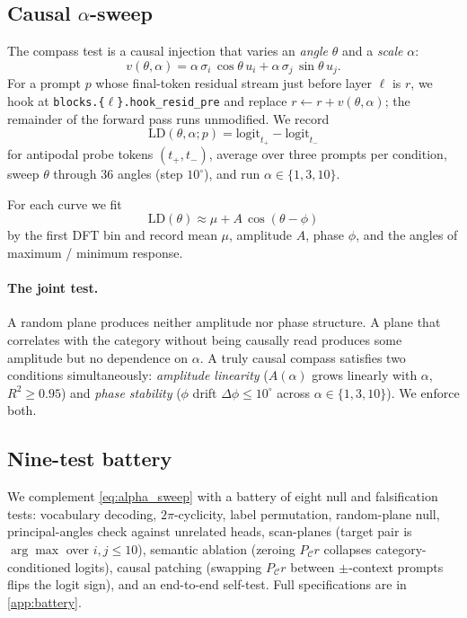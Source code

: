 \subsection{Causal $\alpha$-sweep}
\label{sec:alpha_sweep}

The compass test is a causal injection that varies an \emph{angle}
$\theta$ and a \emph{scale} $\alpha$:
\begin{equation}
v(\theta, \alpha) = \alpha\,\sigma_i\,\cos\theta\,u_i
  + \alpha\,\sigma_j\,\sin\theta\,u_j.
\label{eq:alpha_sweep}
\end{equation}
For a prompt $p$ whose final-token residual stream just before
layer $\ell$ is $r$, we hook at
\texttt{blocks.\{$\ell$\}.hook\_resid\_pre} and replace
$r \gets r + v(\theta, \alpha)$; the remainder of the forward pass
runs unmodified. We record
\begin{equation}
\mathrm{LD}(\theta, \alpha; p) =
  \mathrm{logit}_{t_{+}} - \mathrm{logit}_{t_{-}}
\end{equation}
for antipodal probe tokens $(t_{+}, t_{-})$, average over three
prompts per condition, sweep $\theta$ through $36$ angles (step
$10^\circ$), and run $\alpha \in \{1, 3, 10\}$.

For each curve we fit
\begin{equation}
\mathrm{LD}(\theta) \approx \mu + A\,\cos(\theta - \phi)
\label{eq:sinusoid}
\end{equation}
by the first DFT bin and record mean $\mu$, amplitude $A$, phase
$\phi$, and the angles of maximum / minimum response.

\paragraph{The joint test.} A random plane produces neither
amplitude nor phase structure. A plane that correlates with the
category without being causally read produces some amplitude but
no dependence on $\alpha$. A truly causal compass satisfies two
conditions simultaneously: \emph{amplitude linearity}
($A(\alpha)$ grows linearly with $\alpha$, $R^2 \ge 0.95$) and
\emph{phase stability} ($\phi$ drift $\Delta\phi \le 10^\circ$
across $\alpha \in \{1, 3, 10\}$). We enforce both.

\subsection{Nine-test battery}
\label{sec:battery}

We complement \cref{eq:alpha_sweep} with a battery of eight null
and falsification tests: vocabulary decoding, $2\pi$-cyclicity,
label permutation, random-plane null, principal-angles check
against unrelated heads, scan-planes (target pair is
$\arg\max$ over $i,j \le 10$), semantic ablation (zeroing
$P_{\mathcal{C}} r$ collapses category-conditioned logits),
causal patching (swapping $P_{\mathcal{C}} r$ between
$\pm$-context prompts flips the logit sign), and an end-to-end
self-test. Full specifications are in \cref{app:battery}.

